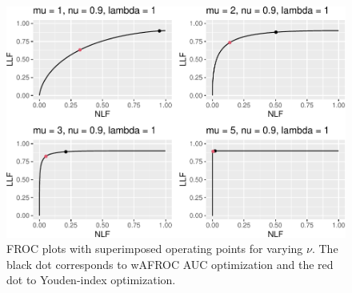 \documentclass[
]{book}
\begin{document}
\begin{table}[H]

\caption{\label{tab:optim-op-point-high-performance-vary-mu-table-vary-all}Summary of optimizations for combinations of levels of $\mu$, $\lambda$ and $\nu$ parameters. FOM = figure of merit, $\zeta_1$ = threshold that optimizes FOM, wAFROC = wAFROC-AUC, ROC = ROC-AUC, Sp = specificity and Se = sensitivity.}
\centering
{}
\end{table}

\begin{figure}
\centering
\includegraphics{21-optim-op-point_files/figure-latex/optim-op-point-high-performance-vary-mu-vary-all-froc-1.pdf}
\caption{\label{fig:optim-op-point-high-performance-vary-mu-vary-all-froc}FROC plots with superimposed operating points for varying \(\nu\). The black dot corresponds to wAFROC AUC optimization and the red dot to Youden-index optimization.}
\end{figure}
\end{document}
